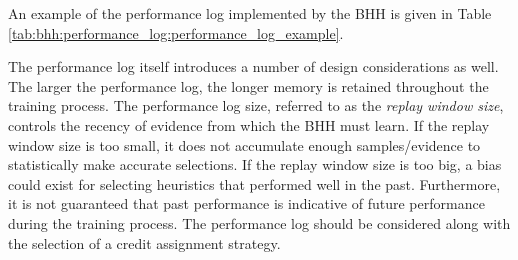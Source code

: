 An example of the performance log implemented by the \acs{BHH} is given in Table \ref{tab:bhh:performance_log:performance_log_example}.

\begin{table}[htbp]
      \centering
      \caption{An example of the performance log implemented by the \acs{BHH}, showing the first five entities, their allocated heuristics and their resulting performance measurements for the first step of the training process.}
      \label{tab:bhh:performance_log:performance_log_example}%
      \par\bigskip
\end{table}%

The performance log itself introduces a number of design considerations as well. The larger the performance log, the longer memory is retained throughout the training process. The performance log size, referred to as the \textit{replay window size}, controls the recency of evidence from which the \acs{BHH} must learn. If the replay window size is too small, it does not accumulate enough samples/evidence to statistically make accurate selections. If the replay window size is too big, a bias could exist for selecting heuristics that performed well in the past. Furthermore, it is not guaranteed that past performance is indicative of future performance during the training process. The performance log should be considered along with the selection of a credit assignment strategy.


